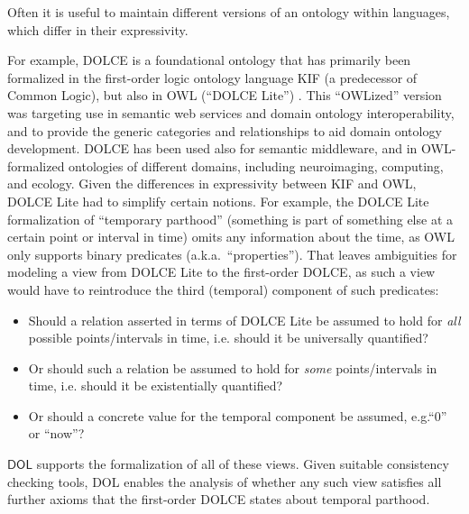 \documentclass[10pt, a4paper]{isov2}
\makeatletter
\newcommand*{\eg}{e.g.\@\xspace}
\newcommand*{\ie}{i.e.\@\xspace}
\newcommand*{\DOL}{\ensuremath{\mathsf{DOL}}\xspace}
\makeatother
\begin{document}

Often it is useful to maintain different versions of an ontology within languages, which differ in 
 their expressivity. 
 
 
For example,  DOLCE is a foundational ontology that has primarily been formalized in
 the first-order logic 
ontology language KIF (a predecessor of Common Logic), but also in OWL (``DOLCE Lite'') 
\cite{dolce}. This ``OWLized'' version was targeting use in semantic web services and domain 
ontology interoperability, and to provide the generic categories and relationships to aid 
 domain ontology development. DOLCE has been used also for semantic middleware, and in 
OWL-formalized ontologies of different domains, including neuroimaging, computing, and ecology.
  Given the differences in expressivity between KIF and OWL, DOLCE Lite 
   had to simplify certain notions.  For example, 
 the DOLCE Lite formalization of ``temporary parthood'' (something is part of something else at a 
certain point or interval in time) omits any information about the time, as OWL only supports 
binary predicates (a.k.a.\ ``properties'').  That leaves ambiguities for modeling a view from
DOLCE Lite to the first-order DOLCE, as such a view would have to reintroduce the third (temporal) 
component of such predicates:
  \begin{itemize}
  \item Should a relation asserted in terms of DOLCE Lite be assumed to hold for \emph{all} possible points/intervals in time, \ie should it be universally quantified?
  \item Or should such a relation be assumed to hold for \emph{some} points/intervals in time, \ie should it be existentially quantified?
  \item Or should a concrete value for the temporal component be assumed, \eg ``0'' or ``now''?
  \end{itemize}
%  
\DOL supports the formalization of  all of these views. Given suitable consistency 
checking tools, DOL enables the analysis of  whether any such view satisfies all further
 axioms that the  first-order DOLCE states about temporal parthood.
\end{document}

